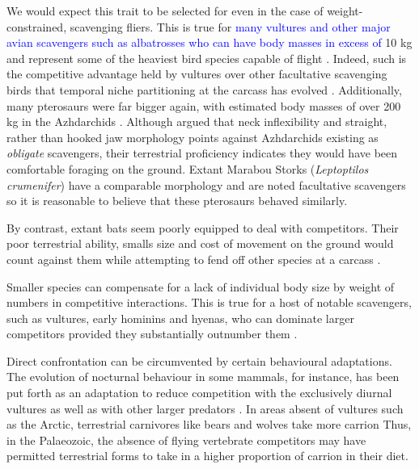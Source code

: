 \documentclass[a4paper,12pt]{article}
\begin{document}
We would expect this trait to be selected for even in the case of weight-constrained, scavenging fliers.
This is true for \textcolor{blue}{many vultures and other major avian scavengers such as albatrosses who can have body masses in excess of} 10 kg and represent some of the heaviest bird species capable of flight \citep{weimerskirch1992reproductive,ferguson2001raptors,donazar2002effects}.
Indeed, such is the competitive advantage held by vultures over other facultative scavenging birds that temporal niche partitioning at the carcass has evolved \textcolor{blue}{\citep{kendall2013alternative,KaneVul,moreno2016behavioral}}. 
Additionally, many pterosaurs were far bigger again, with estimated body masses of over 200 kg in the Azhdarchids \citep{witton2010size}.
Although \cite{witton2008reappraisal} argued that neck inflexibility and straight, rather than hooked jaw morphology points against Azhdarchids existing as \textit{obligate} scavengers, their terrestrial proficiency indicates they would have been comfortable foraging on the ground.
Extant Marabou Storks (\textit{Leptoptilos crumenifer}) have a comparable morphology and are noted facultative scavengers \citep{monadjem2012survival} so it is reasonable to believe that these pterosaurs behaved similarly.

By contrast, extant bats seem poorly equipped to deal with competitors. 
Their poor terrestrial ability, smalls size and cost of movement on the ground would count against them while attempting to fend off other species at a carcass \citep{riskin2006terrestrial,voigt2012terrestrial}.

Smaller species can compensate for a lack of individual body size by weight of numbers in competitive interactions. 
This is true for a host of notable scavengers, such as vultures, early hominins and hyenas, who can dominate larger competitors provided they substantially outnumber them \citep{KaneVul,trinkel2005competitive,ruxton2013endurance}. 

Direct confrontation can be circumvented by certain behavioural adaptations. 
The evolution of nocturnal behaviour in some mammals, for instance, has been put forth as an adaptation to reduce competition with the exclusively diurnal vultures as well as with other larger predators \citep{gittleman2013carnivore,moleon2014inter,pereira2014facultative}. 
In areas absent of vultures such as the Arctic, terrestrial carnivores like bears and wolves take more carrion \citep{devault2003scavenging}
Thus, in the Palaeozoic, the absence of flying vertebrate competitors may have permitted terrestrial forms to take in a higher proportion of carrion in their diet.
\end{document}
